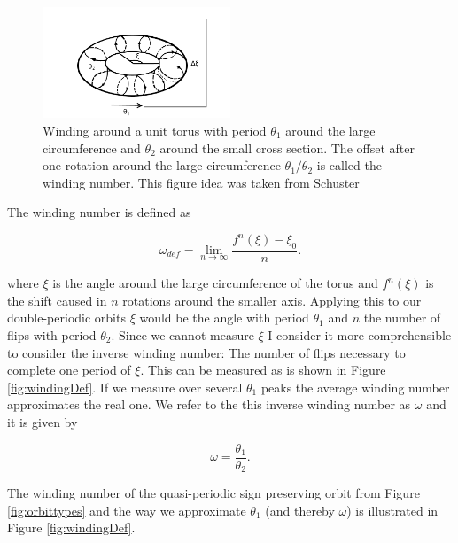 \begin{figure}[H]
\begin{center}
\includegraphics[width=0.5\textwidth]{figures/theory/torus.png}
\end{center}
\caption{Winding around a unit torus with period $\theta_1$ around the large circumference and $\theta_2$ around the small cross section. The offset after one rotation around the large circumference $\theta_1 / \theta_2$ is called the winding number. This figure idea was taken from Schuster \cite{introchaos}}
\label{fig:torus}
\end{figure}

\noindent The winding number is defined as \cite{introchaos}

\begin{equation}
\omega_{def}  = \lim\limits_{n \rightarrow \infty} \frac{f^n(\xi) - \xi_0}{n}.
\end{equation}

where $\xi$ is the angle around the large circumference of the torus and $f^n(\xi)$ is the shift caused in $n$ rotations around the smaller axis. 
Applying this to our double-periodic orbits $\xi$ would be the angle with period $\theta_1$ and $n$ the number of flips with period $\theta_2$. 
Since we cannot measure $\xi$ I consider it more comprehensible to consider the inverse winding number: The number of flips necessary to 
complete one period of $\xi$. This can be measured as is shown in Figure \ref{fig:windingDef}. If we measure over several $\theta_1$ peaks the average winding number approximates the real one. We refer to the this inverse winding number as $\omega$ and it is given by

\begin{equation}\label{eq:winding}
\omega = \frac{\theta_1}{\theta_2}.
\end{equation}

\noindent The winding number of the quasi-periodic sign preserving orbit from Figure \ref{fig:orbittypes} and the way we approximate $\theta_1$ (and thereby $\omega$) is illustrated in Figure \ref{fig:windingDef}.

